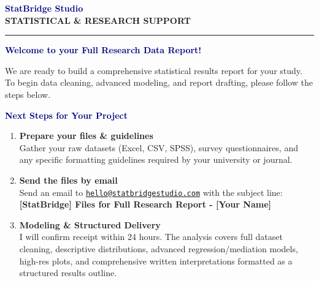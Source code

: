 \documentclass[11pt,a4paper]{article}
\begin{document}
\begin{center}
    {\Huge \bfseries \textcolor{navy}{StatBridge Studio}} \\[0.25em]
    {\small \bfseries \textcolor{amber}{STATISTICAL \& RESEARCH SUPPORT}} \\
    \rule{\linewidth}{1.5pt}
\end{center}

\vspace{2em}

{\LARGE \bfseries \textcolor{navy}{Welcome to your Full Research Data Report!}}

We are ready to build a comprehensive statistical results report for your study. To begin data cleaning, advanced modeling, and report drafting, please follow the steps below.

\vspace{1.5em}

\noindent\makebox[\linewidth]{\rule{\textwidth}{0.8pt}}
\vspace{-0.5em}
\begin{center}
\begin{minipage}{0.95\textwidth}
    {\large \bfseries \textcolor{navy}{Next Steps for Your Project}}
    \begin{enumerate}[label=\textbf{\color{royalblue}\arabic*.}, leftmargin=1.5em]
        \item \textbf{Prepare your files \& guidelines} \\
        Gather your raw datasets (Excel, CSV, SPSS), survey questionnaires, and any specific formatting guidelines required by your university or journal.
        
        \item \textbf{Send the files by email} \\
        Send an email to \href{mailto:hello@statbridgestudio.com}{\texttt{hello@statbridgestudio.com}} with the subject line: \\
        \textbf{[StatBridge] Files for Full Research Report - [Your Name]}
        
        \item \textbf{Modeling \& Structured Delivery} \\
        I will confirm receipt within 24 hours. The analysis covers full dataset cleaning, descriptive distributions, advanced regression/mediation models, high-res plots, and comprehensive written interpretations formatted as a structured results outline.
    \end{enumerate}
\end{minipage}
\end{center}
\noindent\makebox[\linewidth]{\rule{\textwidth}{0.8pt}}
\end{document}
